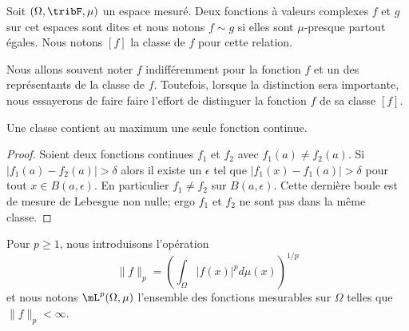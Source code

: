 \begin{definition}      \label{DEFooKMJQooXeaUtp}
	Soit \( (\Omega,\tribF,\mu)\) un espace mesuré. Deux fonctions à valeurs complexes \( f\) et \( g\) sur cet espaces sont dites  et nous notons \( f\sim g\) si elles sont \( \mu\)-presque partout égales. Nous notons \( [f]\) la classe de \( f\) pour cette relation.
\end{definition}

Nous allons souvent noter \( f\) indifféremment pour la fonction \( f\) et un des représentants de la classe de \( f\). Toutefois, lorsque la distinction sera importante, nous essayerons de faire faire l'effort de distinguer la fonction \( f\) de sa classe \( [f]\).

\begin{lemma}
	Une classe contient au maximum une seule fonction continue.
\end{lemma}

\begin{proof}
	Soient deux fonctions continues \( f_1\) et \( f_2\) avec \( f_1(a)\neq f_2(a)\). Si \( | f_1(a)-f_2(a) |>\delta\) alors il existe un \( \epsilon\) tel que \( | f_1(x)-f_1(a) |>\delta\) pour tout \( x\in B(a,\epsilon)\). En particulier \( f_1\neq f_2\) sur \( B(a,\epsilon)\). Cette dernière boule est de mesure de Lebesgue non nulle; ergo \( f_1\) et \( f_2\) ne sont pas dans la même classe.
\end{proof}

\begin{definition}      \label{DEFooTHIDooWYzBtn}
	Pour \( p\geq 1\), nous introduisons l'opération
	\begin{equation}        \label{EQooBDBXooCHRmpo}
		\| f \|_p=\left( \int_{\Omega}| f(x) |^pd\mu(x) \right)^{1/p}
	\end{equation}
	et nous notons \( \mL^p(\Omega,\mu)\) l'ensemble des fonctions mesurables sur \( \Omega\) telles que \( \| f \|_p<\infty\).
\end{definition}

